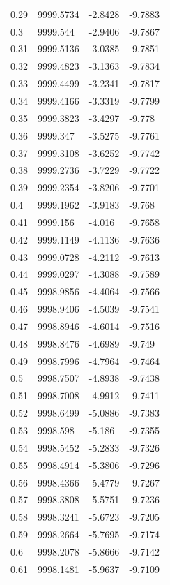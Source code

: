 \begin{table}[H]
\begin{tabular}{llll}
0.29 & 9999.5734 & -2.8428 & -9.7883 \\
0.3 & 9999.544 & -2.9406 & -9.7867 \\
0.31 & 9999.5136 & -3.0385 & -9.7851 \\
0.32 & 9999.4823 & -3.1363 & -9.7834 \\
0.33 & 9999.4499 & -3.2341 & -9.7817 \\
0.34 & 9999.4166 & -3.3319 & -9.7799 \\
0.35 & 9999.3823 & -3.4297 & -9.778 \\
0.36 & 9999.347 & -3.5275 & -9.7761 \\
0.37 & 9999.3108 & -3.6252 & -9.7742 \\
0.38 & 9999.2736 & -3.7229 & -9.7722 \\
0.39 & 9999.2354 & -3.8206 & -9.7701 \\
0.4 & 9999.1962 & -3.9183 & -9.768 \\
0.41 & 9999.156 & -4.016 & -9.7658 \\
0.42 & 9999.1149 & -4.1136 & -9.7636 \\
0.43 & 9999.0728 & -4.2112 & -9.7613 \\
0.44 & 9999.0297 & -4.3088 & -9.7589 \\
0.45 & 9998.9856 & -4.4064 & -9.7566 \\
0.46 & 9998.9406 & -4.5039 & -9.7541 \\
0.47 & 9998.8946 & -4.6014 & -9.7516 \\
0.48 & 9998.8476 & -4.6989 & -9.749 \\
0.49 & 9998.7996 & -4.7964 & -9.7464 \\
0.5 & 9998.7507 & -4.8938 & -9.7438 \\
0.51 & 9998.7008 & -4.9912 & -9.7411 \\
0.52 & 9998.6499 & -5.0886 & -9.7383 \\
0.53 & 9998.598 & -5.186 & -9.7355 \\
0.54 & 9998.5452 & -5.2833 & -9.7326 \\
0.55 & 9998.4914 & -5.3806 & -9.7296 \\
0.56 & 9998.4366 & -5.4779 & -9.7267 \\
0.57 & 9998.3808 & -5.5751 & -9.7236 \\
0.58 & 9998.3241 & -5.6723 & -9.7205 \\
0.59 & 9998.2664 & -5.7695 & -9.7174 \\
0.6 & 9998.2078 & -5.8666 & -9.7142 \\
0.61 & 9998.1481 & -5.9637 & -9.7109 \\

\end{tabular}
\end{table}
